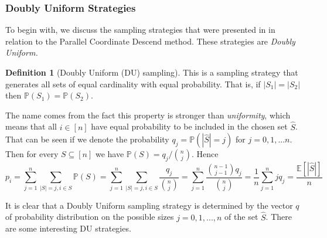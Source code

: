 \documentclass{article}
\theoremstyle{definition}
\newtheorem{definition}{Definition}
\theoremstyle{assumption}
\theoremstyle{lemma}
\theoremstyle{theorem}
\theoremstyle{proposition}
\begin{document}
	\subsubsection{Doubly Uniform Strategies}
	
	To begin with, we discuss the sampling strategies that were presented in \cite{richtarik2016parallel} in relation to the Parallel Coordinate Descend method. These strategies are \textit{Doubly Uniform.}
	
	\begin{definition}[Doubly Uniform (DU) sampling] \label{DU}
		This is a sampling strategy that generates all sets of equal cardinality with equal probability. That is, if $|S_1| = |S_2|$ then $\mathbb P(S_1) = \mathbb P(S_2)$.
	\end{definition}

	The name comes from the fact this property is stronger than \textit{uniformity}, which means that all $i \in [n]$ have equal probability to be included in the chosen set $\hat S$. That can be seen if we denote the probability $q_j = \mathbb P(|\hat S| = j)$ for $j = 0, 1, ... n$. Then for every $S \subseteq [n]$ we have $\mathbb P(S) = q_j / \binom{n}{j}$. Hence
	\begin{equation}
		p_i = \sum \limits_{j=1}^n \sum \limits_{|S|=j, i \in S} \mathbb P(S) = \sum \limits_{j=1}^n \sum \limits_{|S|=j, i \in S} \frac{q_j}{\binom{n}{j}} = \sum \limits_{j=1}^n   \frac{\binom{n-1}{j-1}q_j}{\binom{n}{j}} = \frac{1}{n} \sum \limits_{j=1}^n j q_j = \frac{\mathbb E[|\hat S|]}{n}
	\end{equation}
	
	It is clear that a Doubly Uniform sampling strategy is determined by the vector $q$ of probability distribution on the possible sizes $j = 0, 1, ..., n$ of the set $\hat S$. There are some interesting DU strategies.
	
\end{document}
